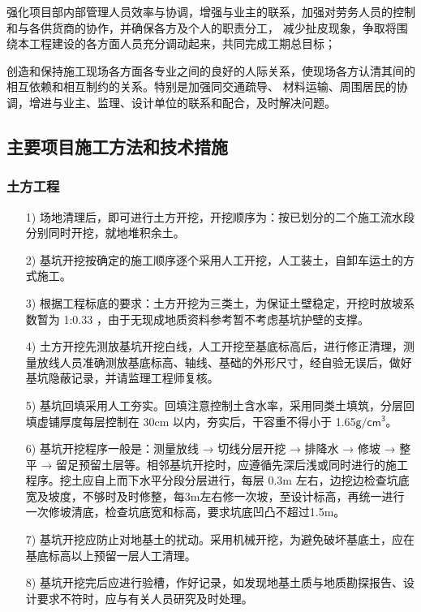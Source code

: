  强化项目部内部管理人员效率与协调，增强与业主的联系，加强对劳务人员的控制和与各供货商的协作，并确保各方及个人的职责分工，
减少扯皮现象，争取将围绕本工程建设的各方面人员充分调动起来，共同完成工期总目标；

 创造和保持施工现场各方面各专业之间的良好的人际关系，使现场各方认清其间的相互依赖和相互制约的关系。特别是加强同交通疏导、
材料运输、周围居民的协调，增进与业主、监理、设计单位的联系和配合，及时解决问题。

\subsection{主要项目施工方法和技术措施}
\subsubsection{土方工程}

\begin{itemize}
    \item [1)]场地清理后，即可进行土方开挖，开挖顺序为：按已划分的二个施工流水段分别同时开挖，就地堆积余土。
    \item [2)]基坑开挖按确定的施工顺序逐个采用人工开挖，人工装土，自卸车运土的方式施工。
    \item [3)]根据工程标底的要求：土方开挖为三类土，为保证土壁稳定，开挖时放坡系数暂为 1:0.33 ，由于无现成地质资料参考暂不考虑基坑护壁的支撑。
    \item [4)]土方开挖先测放基坑开挖白线，人工开挖至基底标高后，进行修正清理，测量放线人员准确测放基底标高、轴线、基础的外形尺寸，经自验无误后，做好基坑隐蔽记录，并请监理工程师复核。
    \item [5)]基坑回填采用人工夯实。回填注意控制土含水率，采用同类土填筑，分层回填虚铺厚度每层控制在 30cm 以内，夯实后，干容重不得小于 1.65$\mathsf{g/cm^3}$。
    \item [6)]基坑开挖程序一般是：测量放线 → 切线分层开挖 → 排降水 → 修坡 → 整平 → 留足预留土层等。相邻基坑开挖时，应遵循先深后浅或同时进行的施工程序。挖土应自上而下水平分段分层进行，每层 0.3m 左右，边挖边检查坑底宽及坡度，不够时及时修整，每3m左右修一次坡，至设计标高，再统一进行一次修坡清底，检查坑底宽和标高，要求坑底凹凸不超过1.5m。
    \item [7)]基坑开挖应防止对地基土的扰动。采用机械开挖，为避免破坏基底土，应在基底标高以上预留一层人工清理。
    \item [8)]基坑开挖完后应进行验槽，作好记录，如发现地基土质与地质勘探报告、设计要求不符时，应与有关人员研究及时处理。
\end{itemize}

